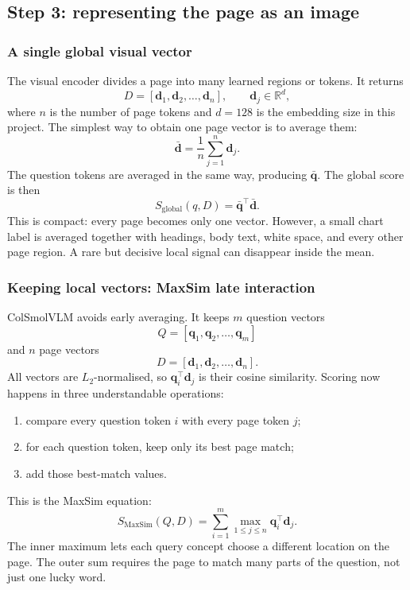 \documentclass[11pt,a4paper]{article}
\newcommand{\R}{\mathbb{R}}
\begin{document}
\subsection{Step 3: representing the page as an image}

\subsubsection*{A single global visual vector}

The visual encoder divides a page into many learned regions or tokens. It returns
\begin{equation}
D=[\bm d_1,\bm d_2,\ldots,\bm d_n], \qquad \bm d_j\in\R^d,
\end{equation}
where $n$ is the number of page tokens and $d=128$ is the embedding size in this project. The simplest way to obtain one page vector is to average them:
\begin{equation}
\bar{\bm d}=\frac{1}{n}\sum_{j=1}^{n}\bm d_j.
\end{equation}
The question tokens are averaged in the same way, producing $\bar{\bm q}$. The global score is then
\begin{equation}
S_{\mathrm{global}}(q,D)=\bar{\bm q}^{\top}\bar{\bm d}.
\end{equation}
This is compact: every page becomes only one vector. However, a small chart label is averaged together with headings, body text, white space, and every other page region. A rare but decisive local signal can disappear inside the mean.

\subsubsection*{Keeping local vectors: MaxSim late interaction}

ColSmolVLM avoids early averaging. It keeps $m$ question vectors
\begin{equation}
Q=[\bm q_1,\bm q_2,\ldots,\bm q_m]
\end{equation}
and $n$ page vectors
\begin{equation}
D=[\bm d_1,\bm d_2,\ldots,\bm d_n].
\end{equation}
All vectors are $L_2$-normalised, so $\bm q_i^\top\bm d_j$ is their cosine similarity. Scoring now happens in three understandable operations:
\begin{enumerate}
  \item compare every question token $i$ with every page token $j$;
  \item for each question token, keep only its best page match;
  \item add those best-match values.
\end{enumerate}
This is the MaxSim equation:
\begin{equation}
\boxed{S_{\mathrm{MaxSim}}(Q,D)=\sum_{i=1}^{m}\max_{1\le j\le n}\bm q_i^\top\bm d_j.}
\label{eq:maxsim}
\end{equation}
The inner maximum lets each query concept choose a different location on the page. The outer sum requires the page to match many parts of the question, not just one lucky word.
\end{document}
